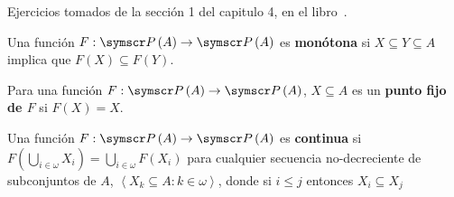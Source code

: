 \documentclass{article}
\begin{document}
\maketitle{}
Ejercicios tomados de la sección 1 del capitulo 4, en el libro~\cite{hrbacek_introduction_1999}.

\begin{definition}
    Una función \(F: \fps{A} \rightarrow \fps{A}\) es \textbf{monótona} 
    si \(X \subseteq Y \subseteq A\) implica que \(F(X) \subseteq F(Y)\).
\end{definition}
\begin{definition}
    Para una función \(F: \fps{A} \rightarrow \fps{A}\), 
    \(X \subseteq A\) es un \textbf{punto fijo de \(F\)} si \(F(X) = X\).
\end{definition}
\begin{enumerate}[label=1.\arabic*,start=10,ref=(1.\arabic*)]
    \label{pt1_10}
    \label{pt1_11}
    \label{pt1_12}
\end{enumerate}
\begin{definition}
    Una función \(F: \fps{A} \rightarrow \fps{A}\) es \textbf{continua} si \(F\left(\bigcup_{i \in \omega} X_i\right) = \bigcup_{i \in \omega} F(X_i)\)
    para cualquier secuencia no-decreciente de subconjuntos de \(A\), \(\left\langle X_k \subseteq A: k \in \omega \right\rangle\), 
    donde si \(i \leq j\) entonces \(X_i \subseteq X_j\)
\end{definition}
\begin{enumerate}[label=1.\arabic*,start=13,ref=(1.\arabic*)]
    \label{pt1_13}
    \label{pt1_14}
\end{enumerate}
    \printbibliography{}
\end{document}
